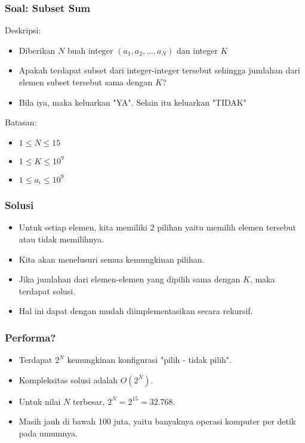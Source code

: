 \begin{frame}
\frametitle{Soal: Subset Sum}
Deskripsi:
\begin{itemize}
  \item Diberikan $N$ buah integer $(a_1, a_2, ..., a_N)$ dan integer $K$
  \item Apakah terdapat subset dari integer-integer tersebut sehingga jumlahan dari elemen subset tersebut sama dengan $K$? 
  \item Bila iya, maka keluarkan "YA". Selain itu keluarkan "TIDAK"
\end{itemize}

Batasan:
\begin{itemize} 
  \item $1 \leq N \leq 15$
  \item $1 \leq K \leq 10^9$
  \item $1 \leq a_i \leq 10^9$
\end{itemize}
\end{frame}

\begin{frame}
\frametitle{Solusi}
\begin{itemize}
  \item Untuk setiap elemen, kita memiliki 2 pilihan yaitu memilih elemen tersebut atau tidak memilihnya.
  \item Kita akan menelusuri semua kemungkinan pilihan.
  \item Jika jumlahan dari elemen-elemen yang dipilih sama dengan $K$, maka terdapat solusi.
  \item Hal ini dapat dengan mudah diimplementasikan secara rekursif.
\end{itemize}
\end{frame}

\begin{frame}
\frametitle{Performa?}
\begin{itemize}
  \item Terdapat $2^N$ kemungkinan konfigurasi "pilih - tidak pilih".
  \item Kompleksitas solusi adalah $O(2^N)$.
  \item Untuk nilai $N$ terbesar, $2^N = 2^{15} = 32.768$.
  \item Masih jauh di bawah 100 juta, yaitu banyaknya operasi komputer per detik pada umumnya.
\end{itemize}
\end{frame}

